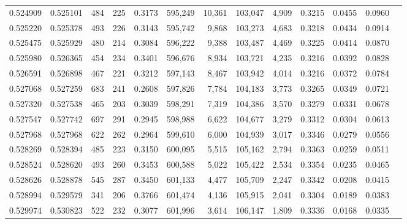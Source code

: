\begin{tabular}{rrrrrrrrrrrrr}
0.524909 & 0.525101 &    484 &   225 &                                     0.3173 & 595,249 &  10,361 & 103,047 &   4,909 & 0.3215 & 0.0455 & 0.0960 \\
0.525220 & 0.525378 &    493 &   226 &                                     0.3143 & 595,742 &   9,868 & 103,273 &   4,683 & 0.3218 & 0.0434 & 0.0914 \\
0.525475 & 0.525929 &    480 &   214 &                                     0.3084 & 596,222 &   9,388 & 103,487 &   4,469 & 0.3225 & 0.0414 & 0.0870 \\
0.525980 & 0.526365 &    454 &   234 &                                     0.3401 & 596,676 &   8,934 & 103,721 &   4,235 & 0.3216 & 0.0392 & 0.0828 \\
0.526591 & 0.526898 &    467 &   221 &                                     0.3212 & 597,143 &   8,467 & 103,942 &   4,014 & 0.3216 & 0.0372 & 0.0784 \\
0.527068 & 0.527259 &    683 &   241 &                                     0.2608 & 597,826 &   7,784 & 104,183 &   3,773 & 0.3265 & 0.0349 & 0.0721 \\
0.527320 & 0.527538 &    465 &   203 &                                     0.3039 & 598,291 &   7,319 & 104,386 &   3,570 & 0.3279 & 0.0331 & 0.0678 \\
0.527547 & 0.527742 &    697 &   291 &                                     0.2945 & 598,988 &   6,622 & 104,677 &   3,279 & 0.3312 & 0.0304 & 0.0613 \\
0.527968 & 0.527968 &    622 &   262 &                                     0.2964 & 599,610 &   6,000 & 104,939 &   3,017 & 0.3346 & 0.0279 & 0.0556 \\
0.528269 & 0.528394 &    485 &   223 &                                     0.3150 & 600,095 &   5,515 & 105,162 &   2,794 & 0.3363 & 0.0259 & 0.0511 \\
0.528524 & 0.528620 &    493 &   260 &                                     0.3453 & 600,588 &   5,022 & 105,422 &   2,534 & 0.3354 & 0.0235 & 0.0465 \\
0.528626 & 0.528878 &    545 &   287 &                                     0.3450 & 601,133 &   4,477 & 105,709 &   2,247 & 0.3342 & 0.0208 & 0.0415 \\
0.528994 & 0.529579 &    341 &   206 &                                     0.3766 & 601,474 &   4,136 & 105,915 &   2,041 & 0.3304 & 0.0189 & 0.0383 \\
0.529974 & 0.530823 &    522 &   232 &                                     0.3077 & 601,996 &   3,614 & 106,147 &   1,809 & 0.3336 & 0.0168 & 0.0335 \\

\end{tabular}
